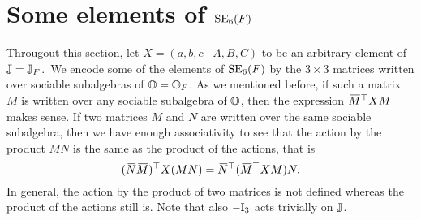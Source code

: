 \section{Some elements of $\mathrm{SE}_6(F)$}
\label{section:elts_E6}

Througout this section, let $X = (a,b,c\mid A,B,C)$ to be an arbitrary element of 
$\mathbb{J} = \mathbb{J}_F$.\ We encode some of the elements of $\mathrm{SE}_6(F)$ by the $3\times 3$
 matrices written over
sociable subalgebras of $\mathbb{O}=\mathbb{O}_{F}$. As we mentioned before, if such a matrix $M$ is written
over any sociable subalgebra of $\mathbb{O}$, then the expression $\mathord{\mbox{\hspace*{0pt}}\,\overline{\!M\!\!\;}\!\:}\mbox{\hspace*{0pt}}^{\top} X M$ makes sense.
If two matrices $M$ and $N$ are written over the same sociable subalgebra, then we have 
enough associativity to see that the action by the product $MN$ is the same as the product
of the actions, that is
\begin{equation}
	(\ovN \ovM)^{\T} X (MN) = \ovN^{\T} (\ovM^{\T} X M) N.
\end{equation} 
In general, the action by the product of two matrices is not defined whereas the product 
of the actions still is. Note that also $-\mathord{\mathrm{I}}_3$ acts trivially on $\mathbb{J}$. 

